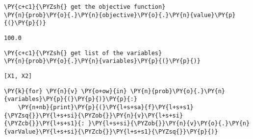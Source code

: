     \begin{tcolorbox}[breakable, size=fbox, boxrule=1pt, pad at break*=1mm,colback=cellbackground, colframe=cellborder]
\begin{Verbatim}[commandchars=\\\{\}]
\PY{c+c1}{\PYZsh{} get the objective function}
\PY{n}{prob}\PY{o}{.}\PY{n}{objective}\PY{o}{.}\PY{n}{value}\PY{p}{(}\PY{p}{)}
\end{Verbatim}
\end{tcolorbox}

            \begin{tcolorbox}[breakable, size=fbox, boxrule=.5pt, pad at break*=1mm, opacityfill=0]
\begin{Verbatim}[commandchars=\\\{\}]
100.0
\end{Verbatim}
\end{tcolorbox}
        
    \begin{tcolorbox}[breakable, size=fbox, boxrule=1pt, pad at break*=1mm,colback=cellbackground, colframe=cellborder]
\begin{Verbatim}[commandchars=\\\{\}]
\PY{c+c1}{\PYZsh{} get list of the variables}
\PY{n}{prob}\PY{o}{.}\PY{n}{variables}\PY{p}{(}\PY{p}{)}
\end{Verbatim}
\end{tcolorbox}

            \begin{tcolorbox}[breakable, size=fbox, boxrule=.5pt, pad at break*=1mm, opacityfill=0]
\begin{Verbatim}[commandchars=\\\{\}]
[X1, X2]
\end{Verbatim}
\end{tcolorbox}
        
    \begin{tcolorbox}[breakable, size=fbox, boxrule=1pt, pad at break*=1mm,colback=cellbackground, colframe=cellborder]
\begin{Verbatim}[commandchars=\\\{\}]
\PY{k}{for} \PY{n}{v} \PY{o+ow}{in} \PY{n}{prob}\PY{o}{.}\PY{n}{variables}\PY{p}{(}\PY{p}{)}\PY{p}{:}
    \PY{n+nb}{print}\PY{p}{(}\PY{l+s+sa}{f}\PY{l+s+s1}{\PYZsq{}}\PY{l+s+si}{\PYZob{}}\PY{n}{v}\PY{l+s+si}{\PYZcb{}}\PY{l+s+s1}{: }\PY{l+s+si}{\PYZob{}}\PY{n}{v}\PY{o}{.}\PY{n}{varValue}\PY{l+s+si}{\PYZcb{}}\PY{l+s+s1}{\PYZsq{}}\PY{p}{)}
\end{Verbatim}
\end{tcolorbox}

